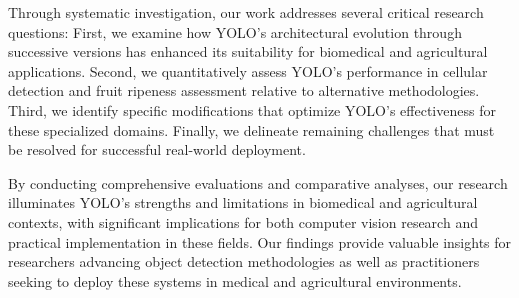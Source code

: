 \begin{multicols}{2}
Through systematic investigation, our work addresses several critical research questions: First, we examine how YOLO's architectural evolution through successive versions has enhanced its suitability for biomedical and agricultural applications. Second, we quantitatively assess YOLO's performance in cellular detection and fruit ripeness assessment relative to alternative methodologies. Third, we identify specific modifications that optimize YOLO's effectiveness for these specialized domains. Finally, we delineate remaining challenges that must be resolved for successful real-world deployment.

By conducting comprehensive evaluations and comparative analyses, our research illuminates YOLO's strengths and limitations in biomedical and agricultural contexts, with significant implications for both computer vision research and practical implementation in these fields. Our findings provide valuable insights for researchers advancing object detection methodologies as well as practitioners seeking to deploy these systems in medical and agricultural environments.
\end{multicols}